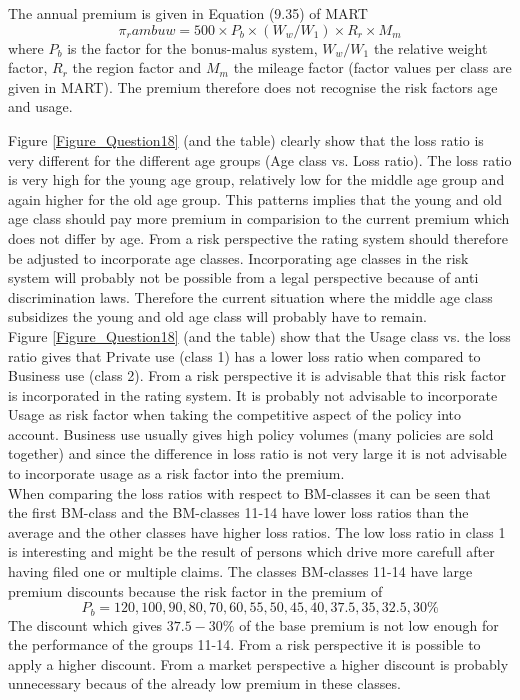 \documentclass[11pt]{article}
\begin{document}
The annual premium is given in Equation (9.35) of MART
\begin{equation}
\pi_rambuw = 500 \times P_b \times (W_w / W_1) \times R_r \times M_m
\end{equation}
where $P_b$ is the factor for the bonus-malus system, $W_w / W_1$ the relative weight factor, $R_r$ the region factor and $M_m$ the mileage factor (factor values per class are given in MART). The premium therefore does not recognise the risk factors age and usage. 

Figure \ref{Figure_Question18} (and the table) clearly show that the loss ratio is very different for the different age groups (Age class vs. Loss ratio). The loss ratio is very high for the young age group, relatively low for the middle age group and again higher for the old age group. This patterns implies that the young and old age class should pay more premium in comparision to the current premium which does not differ by age. From a risk perspective the rating system should therefore be adjusted to incorporate age classes. Incorporating age classes in the risk system will probably not be possible from a legal perspective because of anti discrimination laws. Therefore the current situation where the middle age class subsidizes the young and old age class will probably have to remain. \\

Figure \ref{Figure_Question18} (and the table) show that the Usage class vs. the loss ratio gives that Private use (class 1) has a lower loss ratio when compared to Business use (class 2). From a risk perspective it is advisable that this risk factor is incorporated in the rating system. It is probably not advisable to incorporate Usage as risk factor when taking the competitive aspect of the policy into account. Business use usually gives high policy volumes (many policies are sold together) and since the difference in loss ratio is not very large it is not advisable to incorporate usage as a risk factor into the premium. \\

When comparing the loss ratios with respect to BM-classes it can be seen that the first BM-class and the BM-classes 11-14 have lower loss ratios than the average and the other classes have higher loss ratios. The low loss ratio in class 1 is interesting and might be the result of persons which drive more carefull after having filed one or multiple claims. The classes BM-classes 11-14 have large premium discounts because the risk factor in the premium of
\begin{equation}
P_b = 120,100,90,80,70,60,55,50,45,40,37.5,35,32.5,30 \%
\end{equation} 
The discount which gives $37.5 - 30 \%$ of the base premium is not low enough for the performance of the groups 11-14. From a risk perspective it is possible to apply a higher discount. From a market perspective a higher discount is probably unnecessary becaus of the already low premium in these classes. \\
\end{document}
